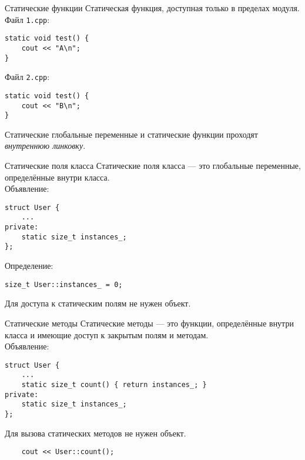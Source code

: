 \documentclass{beamer}
\begin{document}
\begin{frame}[fragile]{Статические функции}
    Статическая функция,
    доступная только в пределах модуля.\\[1em]
Файл {\tt 1.cpp}:
    \begin{lstlisting}
static void test() {
    cout << "A\n";
}
    \end{lstlisting}
Файл {\tt 2.cpp}:
    \begin{lstlisting}
static void test() {
    cout << "B\n";
}
    \end{lstlisting}
Статические глобальные переменные и статические функции
проходят {\em внутреннюю линковку}.
\end{frame}

\begin{frame}[fragile]{Статические поля класса}
    Статические поля класса — это глобальные переменные,
    определённые внутри класса.\\[1em]
Объявление:
\begin{lstlisting}
struct User {
    ...
private:
    static size_t instances_;
}; 
\end{lstlisting}
Определение:
\begin{lstlisting}
size_t User::instances_ = 0;
\end{lstlisting}
Для доступа к статическим полям не нужен объект.
\end{frame}

\begin{frame}[fragile]{Статические методы}
    Статические методы — это функции, определённые внутри класса и имеющие
    доступ к закрытым полям и методам.\\[1em]
Объявление:
\begin{lstlisting}
struct User {
    ...
    static size_t count() { return instances_; }
private:
    static size_t instances_;
}; 
\end{lstlisting}
Для вызова статических методов не нужен объект.
\begin{lstlisting}
    cout << User::count();
\end{lstlisting}
\end{frame}
    
\end{document}
